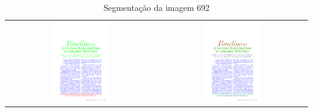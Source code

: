 \documentclass[a4paper,11pt]{article}
\begin{document}
    \begin{table}[p]
      \caption{Segmentação da imagem 692}
      \begin{center}
        \begin{tabular}{ c c }
        \includegraphics[width=0.4\textwidth]{assets/final_ideal/cacm_692_ideal.png}
        &
        \includegraphics[width=0.4\textwidth]{assets/result_imagens/cacm_50_percent_sparse_9x9_692_final.png}
        \end{tabular}
      \end{center}
      \label{tab:segmentation_692}
    \end{table}
\end{document}
